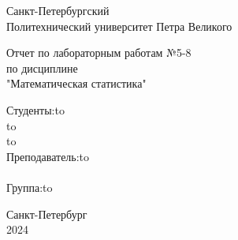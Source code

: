 \documentclass[12pt]{article}
\begin{document}
\begin{titlepage}

\Large

\begin{center}
Санкт-Петербургский \\ Политехнический университет Петра Великого

\vspace{10em}

Отчет по лабораторным работам №5-8\\
по дисциплине\\
"Математическая статистика"\\

\vspace{2em}

\end{center}

\vspace{6em}

\newbox{\lbox}
\newlength{\maxl}
\setlength{\maxl}{\wd\lbox}
\hfill\parbox{12cm}{
\hspace*{3cm}\hspace*{-5cm}Студенты:\hfill\hbox to\\
\hspace*{3cm}\hspace*{-5cm}\hfill\hbox to\\
\hspace*{3cm}\hspace*{-5cm}\hfill\hbox to\\
\hspace*{3cm}\hspace*{-5cm}Преподаватель:\hfill\hbox to\\
\\
\hspace*{3cm}\hspace*{-5cm}Группа:\hfill\hbox to\\
}

\vspace{\fill}

\begin{center}
Санкт-Петербург \\2024
\end{center}

\end{titlepage}
\end{document}
